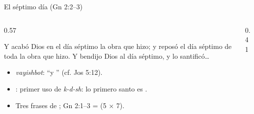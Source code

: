 \begin{frame}{El séptimo día (Gn 2:2--3)}
\begin{columns}[c,onlytextwidth]
\begin{column}{0.57\textwidth}
\begin{cita}Y acabó Dios en el día séptimo la obra que hizo; y reposó el día séptimo de toda la obra que hizo. Y bendijo Dios al día séptimo, y lo santificó\ldots{}\end{cita}
\scriptsize
\begin{itemize}
\item {} \emph{vayishbot}: ``y '' (cf. Jos 5:12).
\item {}: primer uso de \emph{k-d-sh}: lo primero santo es .
\item Tres frases de ; Gn 2:1--3 =  (5 × 7).
\end{itemize}
\end{column}
\begin{column}{0.41\textwidth}\end{column}
\end{columns}
\end{frame}

